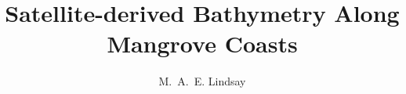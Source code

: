 \documentclass[whitelogo]{tudelft-report}
\begin{document}
\frontmatter

\title[tudelft-white]{Satellite-derived Bathymetry Along Mangrove Coasts}
\author[tudelft-white]{M.~A.~E. Lindsay}
\makecover[split]


% 

% 

\tableofcontents
\listofpdfcomments

\mainmatter










\appendix



%

\renewcommand*{\mkbibnamefamily}[1]{\textsc{#1}}
\renewcommand*{\mkbibnameprefix}[1]{\textsc{#1}}
\renewcommand*{\mkbibnamegiven}[1]{\textsc{#1}}

\printbibliography
\end{document}
